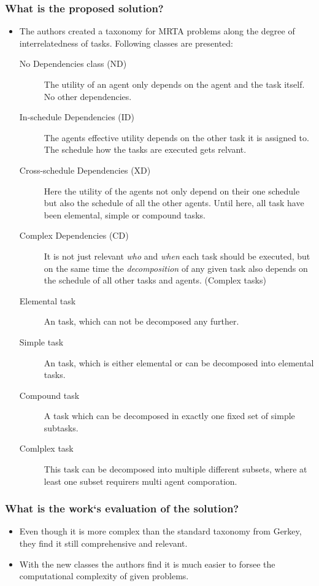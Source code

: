 \documentclass{article}
\begin{document}
\subsubsection*{What is the proposed solution?}
\begin{itemize}
  \item The authors created a taxonomy for MRTA problems along the degree of interrelatedness of tasks. Following classes are presented: \ 
  \begin{description}
      \item[No Dependencies class (ND)] The utility of an agent only depends on the agent and the task itself. No other dependencies. 
      \item[In-schedule Dependencies (ID)] The agents effective utility depends on the other task it is assigned to. The schedule how the tasks are executed gets relvant.
      \item[Cross-schedule Dependencies (XD)] Here the utility of the agents not only depend on their one schedule but also the schedule of all the other agents. Until here, all task have been elemental, simple or compound tasks.
      \item[Complex Dependencies (CD)] It is not just relevant \emph{who} and \emph{when} each task should be executed, but on the same time the \emph{decomposition} of any given task also depends on the schedule of all other tasks and agents. (Complex tasks)
      \item[Elemental task]  An task, which can not be decomposed any further.
      \item[Simple task]  An task, which is either elemental or can be decomposed into elemental tasks.
      \item[Compound task] A task which can be decomposed in exactly one fixed set of simple subtasks.
      \item[Comlplex task] This task can be decomposed into multiple different subsets, where at least one subset requirers multi agent comporation.
  \end{description}
\end{itemize}
\subsubsection*{What is the work`s evaluation of the solution?}
\begin{itemize}
    \item Even though it is more complex than the standard taxonomy from Gerkey, they find it still comprehensive and relevant. 
    \item With the new classes the authors find it is much easier to forsee the computational complexity of given problems.
\end{itemize}
\end{document}
